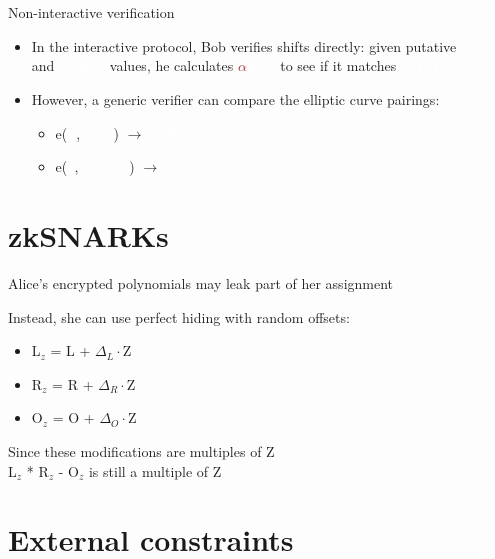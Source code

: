 \documentclass[dvipsnames]{beamer}
\newcommand{\priv}[1]{\textcolor{brown}{\texttt{#1}}}
\newcommand{\enc}[1]{\colorbox{SkyBlue!75}{\textcolor{white}{\texttt{#1}}}}
\newcommand{\encB}[1]{\colorbox{PineGreen}{\textcolor{white}{\texttt{#1}}}}
\newcommand{\pairing}[3]{e(\enc{#1}, \enc{#2}) $\rightarrow$ \encB{#3}}
\begin{document}
    \begin{frame}{Non-interactive verification}
        \begin{itemize}
            \item[] In the interactive protocol, Bob verifies shifts directly: given putative \enc{H(s)} and \enc{$\alpha \cdot$H(s)} values, he calculates \priv{$\alpha$}\enc{H(s)} to see if it matches \enc{$\alpha \cdot$H(s)}
            \item[] However, a generic verifier can compare the elliptic curve pairings:
            \begin{itemize}
                \item \pairing{$\alpha$}{H(s)}{$\alpha \cdot$H(s)}
                \item \pairing{1}{$\alpha \cdot$H(s)}{$\alpha \cdot$H(s)}
            \end{itemize}
        \end{itemize}
    \end{frame}


    \section{zkSNARKs}

    \begin{frame}
        Alice's encrypted polynomials may leak part of her assignment\\
        \vspace{0.6cm}

        Instead, she can use perfect hiding with random offsets:
        \begin{itemize}
            \item L$_z$ = L + $\Delta_L \cdot$Z
            \item R$_z$ = R + $\Delta_R \cdot$Z
            \item O$_z$ = O + $\Delta_O \cdot$Z
        \end{itemize}
        \vspace{0.6cm}

        Since these modifications are multiples of Z\\
        L$_z$ * R$_z$ - O$_z$ is still a multiple of Z
    \end{frame}

    \section{External constraints}
\end{document}
